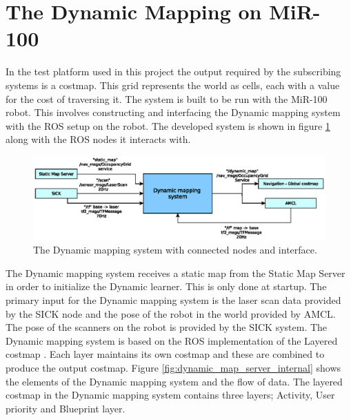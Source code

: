 \section{The Dynamic Mapping on MiR-100}
In the test platform used in this project the output required by the subscribing systems is a costmap. This grid represents the world as cells, each with a value for the cost of traversing it. 
The system is built to be run with the MiR-100 robot. This involves constructing and interfacing the Dynamic mapping system with the ROS setup on the robot. The developed system is shown in figure \ref{fig:mir_interface} along with the ROS nodes it interacts with. 

\begin{figure}[htbp]
	\centering
	\includegraphics[width=1\linewidth]{chapters/cost_interpretation/figures/dynamic_map_mir_interface.eps}
	\caption{The Dynamic mapping system with connected nodes and interface.}
	\label{fig:mir_interface}
\end{figure}

The Dynamic mapping system receives a static map from the Static Map Server in order to initialize the Dynamic learner. This is only done at startup. The primary input for the Dynamic mapping system is the laser scan data provided by the SICK node and the pose of the robot in the world provided by AMCL. The pose of the scanners on the robot is provided by the SICK system. 
The Dynamic mapping system is based on the ROS implementation of the Layered costmap \cite{lu2014layered}. Each layer maintains its own costmap and these are combined to produce the output costmap. Figure \ref{fig:dynamic_map_server_internal} shows the elements of the Dynamic mapping system and the flow of data. The layered costmap in the Dynamic mapping system contains three layers; Activity, User priority and Blueprint layer. 

